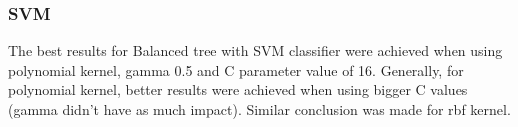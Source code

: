 \subsubsection{SVM}

The best results for Balanced tree with SVM classifier were achieved when using polynomial kernel, gamma 0.5 and C parameter value of 16. Generally, for polynomial kernel, better results were achieved when using bigger C values (gamma didn't have as much impact). Similar conclusion was made for rbf kernel.

\begin{table}[htp]
	\centering
	\caption{Results for Balanced tree using SVM classifier with C=16, gamma=0.5 and kernel=poly}
	\label{balanced_tree_svm_results}
\end{table}

